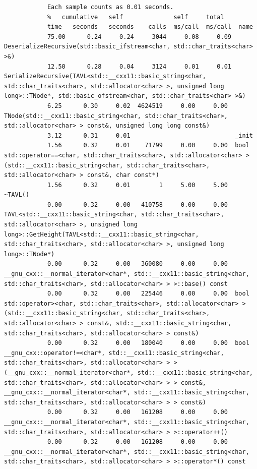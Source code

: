 \documentclass[12pt]{article}
\begin{document}
\begin{small}
\begin{verbatim}
			Each sample counts as 0.01 seconds.
			%   cumulative   self              self     total           
			time   seconds   seconds    calls  ms/call  ms/call  name    
			75.00      0.24     0.24     3044     0.08     0.09  DeserializeRecursive(std::basic_ifstream<char, std::char_traits<char> >&)
			12.50      0.28     0.04     3124     0.01     0.01  SerializeRecursive(TAVL<std::__cxx11::basic_string<char, std::char_traits<char>, std::allocator<char> >, unsigned long long>::TNode*, std::basic_ofstream<char, std::char_traits<char> >&)
			6.25      0.30     0.02  4624519     0.00     0.00  TNode(std::__cxx11::basic_string<char, std::char_traits<char>, std::allocator<char> > const&, unsigned long long const&)
			3.12      0.31     0.01                             _init
			1.56      0.32     0.01    71799     0.00     0.00  bool std::operator==<char, std::char_traits<char>, std::allocator<char> >(std::__cxx11::basic_string<char, std::char_traits<char>, std::allocator<char> > const&, char const*)
			1.56      0.32     0.01        1     5.00     5.00  ~TAVL()
			0.00      0.32     0.00   410758     0.00     0.00  TAVL<std::__cxx11::basic_string<char, std::char_traits<char>, std::allocator<char> >, unsigned long long>::GetHeight(TAVL<std::__cxx11::basic_string<char, std::char_traits<char>, std::allocator<char> >, unsigned long long>::TNode*)
			0.00      0.32     0.00   360080     0.00     0.00  __gnu_cxx::__normal_iterator<char*, std::__cxx11::basic_string<char, std::char_traits<char>, std::allocator<char> > >::base() const
			0.00      0.32     0.00   225446     0.00     0.00  bool std::operator><char, std::char_traits<char>, std::allocator<char> >(std::__cxx11::basic_string<char, std::char_traits<char>, std::allocator<char> > const&, std::__cxx11::basic_string<char, std::char_traits<char>, std::allocator<char> > const&)
			0.00      0.32     0.00   180040     0.00     0.00  bool __gnu_cxx::operator!=<char*, std::__cxx11::basic_string<char, std::char_traits<char>, std::allocator<char> > >(__gnu_cxx::__normal_iterator<char*, std::__cxx11::basic_string<char, std::char_traits<char>, std::allocator<char> > > const&, __gnu_cxx::__normal_iterator<char*, std::__cxx11::basic_string<char, std::char_traits<char>, std::allocator<char> > > const&)
			0.00      0.32     0.00   161208     0.00     0.00  __gnu_cxx::__normal_iterator<char*, std::__cxx11::basic_string<char, std::char_traits<char>, std::allocator<char> > >::operator++()
			0.00      0.32     0.00   161208     0.00     0.00  __gnu_cxx::__normal_iterator<char*, std::__cxx11::basic_string<char, std::char_traits<char>, std::allocator<char> > >::operator*() const

\end{verbatim}
\end{small}
\end{document}
